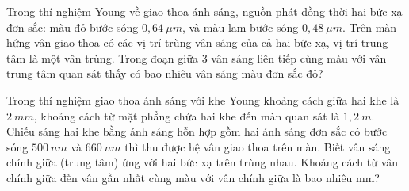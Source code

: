 \begin{ex}
Trong thí nghiệm Young về giao thoa ánh sáng, nguồn phát đồng thời hai bức xạ đơn sắc: màu đỏ bước sóng $0,64\  \mu m$, và màu lam bước sóng $0,48\  \mu m$. Trên màn hứng vân giao thoa có các vị trí trùng vân sáng của cả hai bức xạ, vị trí trung tâm là một vân trùng. Trong đoạn giữa 3 vân sáng liên tiếp cùng màu với vân trung tâm quan sát thấy có bao nhiêu vân sáng màu đơn sắc đỏ?
\end{ex}
\begin{ex}
Trong thí nghiệm giao thoa ánh sáng với khe Young khoảng cách giữa hai khe là $2\ mm$, khoảng cách từ mặt phẳng chứa hai khe đến màn quan sát là $1,2\ m$. Chiếu sáng hai khe bằng ánh sáng hỗn hợp gồm hai ánh sáng đơn sắc có bước sóng $500\ nm$ và $660\ nm$ thì thu được hệ vân giao thoa trên màn. Biết vân sáng chính giữa (trung tâm) ứng với hai bức xạ trên trùng nhau. Khoảng cách từ vân chính giữa đến vân gần nhất cùng màu với vân chính giữa là bao nhiêu mm?
\end{ex}










